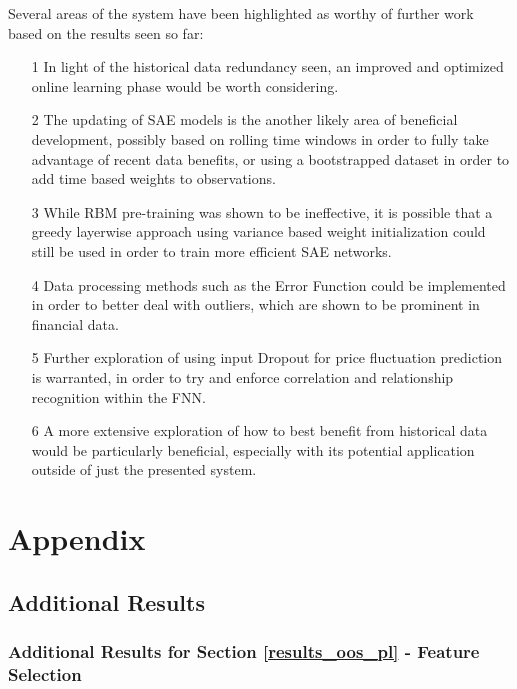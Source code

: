 \documentclass[a4paper,11pt,oneside]{article}
\theoremstyle{plain}
\theoremstyle{definition}
\begin{document}
	Several areas of the system have been highlighted as worthy of further work based on the results seen so far: 
	\begin{itemize}
		\item [1] In light of the historical data redundancy seen, an improved and optimized online learning phase would be worth considering.
		\item [2] The updating of SAE models is the another likely area of beneficial development, possibly based on rolling time windows in order to fully take advantage of recent data benefits, or using a bootstrapped dataset in order to add time based weights to observations.
		\item [3] While RBM pre-training was shown to be ineffective, it is possible that a greedy layerwise approach using variance based weight initialization could still be used in order to train more efficient SAE networks.
		\item [4] Data processing methods such as the Error Function could be implemented in order to better deal with outliers, which are shown to be prominent in financial data.
		\item [5] Further exploration of using input Dropout for price fluctuation prediction is warranted, in order to try and enforce correlation and relationship recognition within the FNN.
		\item [6] A more extensive exploration of how to best benefit from historical data would be particularly beneficial, especially with its potential application outside of just the presented system.
	\end{itemize}
	
	\newpage
	\section{Appendix}\label{Appendix}
	
	\subsection{Additional Results}
	
	\subsubsection{Additional Results for Section \ref{results_oos_pl} - Feature Selection }\label{results_features_appendix}
	
\end{document}
